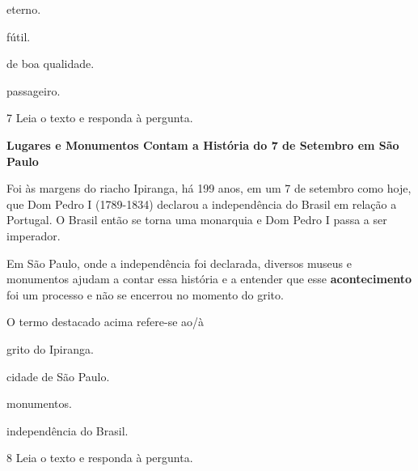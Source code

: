 \begin{multicols}{2}
\begin{escolha}
  \item eterno.

  \item fútil.

  \item de boa qualidade.

  \item passageiro.
\end{escolha}
\end{multicols}

\num{7} Leia o texto e responda à pergunta.

\begin{myquote}
\textbf{Lugares e Monumentos Contam a História do 7 de Setembro em São
Paulo}

Foi às margens do riacho Ipiranga, há 199 anos, em um 7 de setembro como
hoje, que Dom Pedro I (1789-1834) declarou a independência do Brasil em
relação a Portugal. O Brasil então se torna uma monarquia e Dom Pedro I
passa a ser imperador.

Em São Paulo, onde a independência foi declarada, diversos museus e
monumentos ajudam a contar essa história e a entender que esse
\textbf{acontecimento} foi um processo e não se encerrou no momento do
grito.

\end{myquote}

O termo destacado acima refere-se ao/à

\begin{multicols}{2}
\begin{escolha}
  \item grito do Ipiranga.

  \item cidade de São Paulo.

  \item monumentos.

  \item independência do Brasil.
\end{escolha}
\end{multicols}

\num{8} Leia o texto e responda à pergunta.

